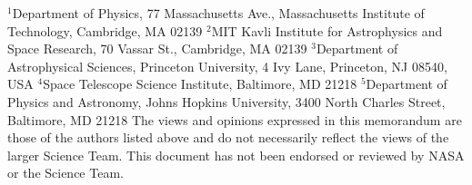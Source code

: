 {\tiny\noindent
$^1$Department of Physics, 77 Massachusetts Ave., Massachusetts 
Institute of Technology, Cambridge, MA 02139\newline
\noindent$^2$MIT Kavli Institute for Astrophysics and Space Research, 70 Vassar
St., Cambridge, MA 02139\newline
\noindent$^3$Department of Astrophysical Sciences, Princeton University, 4 Ivy 
Lane, Princeton, NJ 08540, USA\newline	
\noindent$^4$Space Telescope Science Institute, Baltimore, MD 21218\newline
\vspace{0cm} \noindent$^5$Department of Physics and Astronomy, Johns 
Hopkins 
University, 3400 North Charles Street, Baltimore, MD 21218 \newline
\noindent\vspace{-0.222cm}{\bf NOTE:} The views and opinions expressed in this memorandum are those of the authors listed above and do not necessarily reflect the views of the larger \tess Science Team.  This document has not been endorsed or reviewed by NASA or the \tess Science Team.}
\vspace{-0.1cm}
